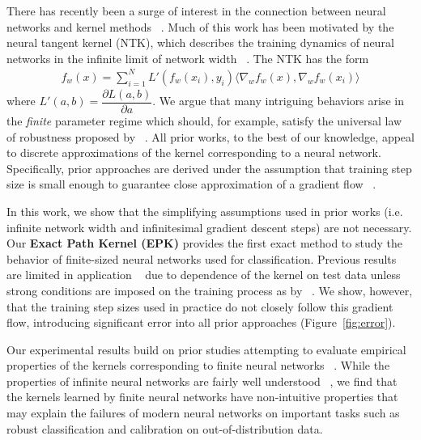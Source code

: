 There has recently been a surge of interest in the connection between neural networks and kernel methods ~\citep{bietti2019bias, du2019graphntk, tancik2020fourierfeatures, abdar2021uq, geifman2020similarity, chen2020generalized, alemohammad2021recurrent}. Much of this work has been motivated by the neural tangent kernel (NTK), which describes the training dynamics of neural networks in the infinite limit of network width ~\citep{jacot2018neural}. The NTK has the form
\begin{align}
  f_{w}(x) = \sum_{i=1}^N L'(f_w(x_i), y_i) \langle \nabla_w f_w(x), \nabla_w f_w(x_i) \rangle
\end{align}
where $L'(a, b) = \dfrac{\partial L(a, b)}{\partial a}$. 
We argue that many intriguing behaviors arise in the \emph{finite} parameter regime which should, for example, satisfy the universal law of robustness proposed by ~\citet{DBLP:conf/nips/BubeckS21}. 
All prior works, to the best of our knowledge, appeal to discrete approximations of the kernel corresponding to a neural network. 
Specifically, prior approaches are derived under the assumption that training step size is small enough to guarantee close approximation of a gradient flow
~\citep{ghojogh2021, shawe2004kernel, zhao2005extracting}.

In this work, we show that the simplifying assumptions used in prior works (i.e. infinite network width and infinitesimal gradient descent steps) are not necessary. Our \textbf{Exact Path Kernel (EPK)} provides the first exact method to study the behavior of finite-sized neural networks used for classification.
Previous results are limited in application ~\citep{incudini2022quantum} due to dependence of the kernel on test data unless strong conditions are imposed on the training process as by ~\citet{chen2021equivalence}. We show, however, that the training step sizes used in practice do not closely follow this gradient flow, introducing significant error into all prior approaches (Figure~\ref{fig:error}).

Our experimental results build on prior studies attempting to evaluate empirical properties of the kernels corresponding to finite neural networks ~\citep{DBLP:conf/iclr/LeeBNSPS18, chen2021equivalence}. While the properties of infinite neural networks are fairly well understood ~\citep{neal1996priors}, we find that the kernels learned by finite neural networks have non-intuitive properties that may explain the failures of modern neural networks on important tasks such as robust classification and calibration on out-of-distribution data.

